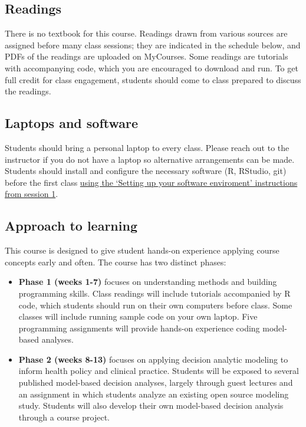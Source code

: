 \documentclass[
  letterpaper,
  DIV=11,
  numbers=noendperiod]{scrartcl}
\providecommand{\tightlist}{%
  \setlength{\itemsep}{0pt}\setlength{\parskip}{0pt}}\usepackage{longtable,booktabs,array}
\begin{document}
\hypertarget{readings}{%
\subsection{Readings}\label{readings}}

There is no textbook for this course. Readings drawn from various
sources are assigned before many class sessions; they are indicated in
the schedule below, and PDFs of the readings are uploaded on MyCourses.
Some readings are tutorials with accompanying code, which you are
encouraged to download and run. To get full credit for class engagement,
students should come to class prepared to discuss the readings.

\hypertarget{laptops-and-software}{%
\subsection{Laptops and software}\label{laptops-and-software}}

Students should bring a personal laptop to every class. Please reach out
to the instructor if you do not have a laptop so alternative
arrangements can be made. Students should install and configure the
necessary software (R, RStudio, git) before the first class
\href{https://htmlpreview.github.io/?https://github.com/altonrus/epib-676/blob/main/sessions/01-introduction/get-set-up.html}{using
the `Setting up your software enviroment' instructions from session 1}.

\hypertarget{approach-to-learning}{%
\subsection{Approach to learning}\label{approach-to-learning}}

This course is designed to give student hands-on experience applying
course concepts early and often. The course has two distinct phases:

\begin{itemize}
\tightlist
\item
  \textbf{Phase 1 (weeks 1-7)} focuses on understanding methods and
  building programming skills. Class readings will include tutorials
  accompanied by R code, which students should run on their own
  computers before class. Some classes will include running sample code
  on your own laptop. Five programming assignments will provide hands-on
  experience coding model-based analyses.
\item
  \textbf{Phase 2 (weeks 8-13)} focuses on applying decision analytic
  modeling to inform health policy and clinical practice. Students will
  be exposed to several published model-based decision analyses, largely
  through guest lectures and an assignment in which students analyze an
  existing open source modeling study. Students will also develop their
  own model-based decision analysis through a course project.
\end{itemize}
\end{document}
